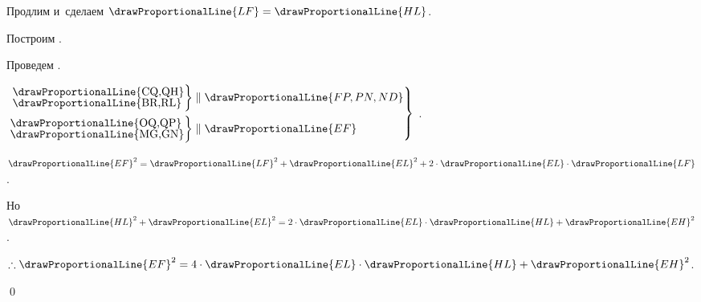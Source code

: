 \documentclass[letters,booklanguage=russian]{byrnebook}
\begin{document}
\begin{center}
Продлим  и~сделаем $\drawProportionalLine{LF} = \drawProportionalLine{HL}$.

Построим  .

Проведем .

$\left.
\begin{aligned}
	\left.
	\begin{aligned}
		\vcenter{
		\nointerlineskip\hbox{\drawProportionalLine{CQ,QH}}
		\nointerlineskip\hbox{\drawProportionalLine{BR,RL}}
		}
	\end{aligned}
	\right\} & \parallel \drawProportionalLine{FP,PN,ND}\\
	\left.
	\begin{aligned}
		\vcenter{
		\nointerlineskip\hbox{\drawProportionalLine{OQ,QP}}
		\nointerlineskip\hbox{\drawProportionalLine{MG,GN}}
		}
	\end{aligned}
	\right\} & \parallel \drawProportionalLine{EF}\\
\end{aligned}
\right\}$ .

$\drawProportionalLine{EF}^2 = \drawProportionalLine{LF}^2 + \drawProportionalLine{EL}^2 + 2 \cdot \drawProportionalLine{EL} \cdot \drawProportionalLine{LF}$ .

Но $\drawProportionalLine{HL}^2 + \drawProportionalLine{EL}^2 = 2 \cdot \drawProportionalLine{EL} \cdot \drawProportionalLine{HL} + \drawProportionalLine{EH}^2$ .

$\therefore \drawProportionalLine{EF}^2 = 4 \cdot \drawProportionalLine{EL} \cdot \drawProportionalLine{HL} + \drawProportionalLine{EH}^2$.
\end{center}

\qed
\end{document}
